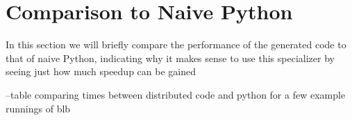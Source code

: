 \section{Comparison to Naive Python}

In this section we will briefly compare the performance of the generated code to that of naive Python, indicating why it makes sense to use this specializer by seeing just how much speedup can be gained 

--table comparing times between distributed code and python for a few example runnings of blb  
